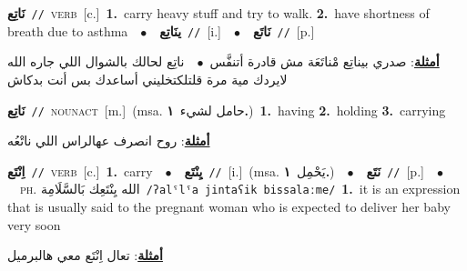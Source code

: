 \documentclass[10pt,a4paper,twoside]{article} %
\begin{document}
\begin{multicols}{2}
{{{{{{{{{{{{\setlength\topsep{0pt}\textbf{\foreignlanguage{arabic}{نَاتِع}}\ {\color{gray}\texttt{//}\color{black}}\ \textsc{verb}\ [c.]\ \textbf{1.}~carry heavy stuff and try to walk.  \textbf{2.}~have shortness of breath due to asthma\ \ $\bullet$\ \ \setlength\topsep{0pt}\textbf{\foreignlanguage{arabic}{ينَاتِع}}\ {\color{gray}\texttt{//}\color{black}}\ [i.]\ \ $\bullet$\ \ \setlength\topsep{0pt}\textbf{\foreignlanguage{arabic}{نَاتَع}}\ {\color{gray}\texttt{//}\color{black}}\ [p.]\  \begin{flushright}\color{gray}\foreignlanguage{arabic}{\textbf{\underline{\foreignlanguage{arabic}{أمثلة}}}: صدري بيناتِع مْناتَعَة مش قادرة أتنفَّس\ $\bullet$\ \  ناتِع لحالك بالشوال اللي جاره الله لايردك مية مرة قلتلكتخليني أساعدك بس أنت بدكاش}\end{flushright}\color{black}} \vspace{2mm}

{\setlength\topsep{0pt}\textbf{\foreignlanguage{arabic}{نَاتِع}}\ {\color{gray}\texttt{//}\color{black}}\ \textsc{noun\textunderscore act}\ [m.]\ \color{gray}(msa. \foreignlanguage{arabic}{حامل لشيء}~\foreignlanguage{arabic}{\textbf{١.}})\color{black}\ \textbf{1.}~having  \textbf{2.}~holding  \textbf{3.}~carrying\  \begin{flushright}\color{gray}\foreignlanguage{arabic}{\textbf{\underline{\foreignlanguage{arabic}{أمثلة}}}: روح انصرف عهالراس اللي ناتْعُه}\end{flushright}\color{black}} \vspace{2mm}

{\setlength\topsep{0pt}\textbf{\foreignlanguage{arabic}{اِنْتَع}}\ {\color{gray}\texttt{//}\color{black}}\ \textsc{verb}\ [c.]\ \textbf{1.}~carry\ \ $\bullet$\ \ \setlength\topsep{0pt}\textbf{\foreignlanguage{arabic}{يِنْتَع}}\ {\color{gray}\texttt{//}\color{black}}\ [i.]\ \color{gray}(msa. \foreignlanguage{arabic}{يَحْمِل}~\foreignlanguage{arabic}{\textbf{١.}})\color{black}\ \ $\bullet$\ \ \setlength\topsep{0pt}\textbf{\foreignlanguage{arabic}{نَتَع}}\ {\color{gray}\texttt{//}\color{black}}\ [p.]\ \ $\bullet$\ \ \textsc{ph.} \color{gray} \foreignlanguage{arabic}{الله يِنْتَعِك بَالسَّلَامِة}\color{black}\ {\color{gray}\texttt{/{\sffamily ʔalˤlˤa jintaʕik bissalaːme}/}\color{black}}\ \textbf{1.}~it is an expression that is usually said to the pregnant woman who is expected to deliver her baby very soon\  \begin{flushright}\color{gray}\foreignlanguage{arabic}{\textbf{\underline{\foreignlanguage{arabic}{أمثلة}}}: تعال اِنْتَع معي هالبرميل}\end{flushright}\color{black}} \vspace{2mm}

}}}}}}}}}}}
\end{multicols}
\end{document}
